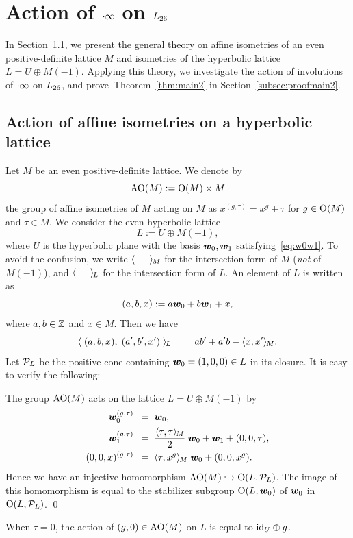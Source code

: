 \documentclass{amsart} %
\begin{document}
\section{Action of $\cdot \infty$ on $L_{26}$}\label{sec:proofThm2}
%
In  Section~\ref{subsec:AOGM}, 
we present the general theory on  affine isometries of an even positive-definite lattice $M$
and isometries of the hyperbolic  lattice $L=U\oplus M(-1)$.
Applying this theory,
we investigate the action of involutions of $\cdot \infty$ on $L_{26}$,
and prove~Theorem~\ref{thm:main2} in Section~\ref{subsec:proofmain2}.
%
%
\subsection{Action of affine isometries on a hyperbolic lattice}\label{subsec:AOGM}
%
Let $M$ be an even positive-definite lattice.
We denote by 
\[
\mathord{\mathrm{AO}}(M):=\mathord{\mathrm{O}}(M)\ltimes M
\]
 the group of affine isometries of $M$
acting on $M$ as $x^{(g, \tau)}=x^g+\tau$
for $g\in \mathord{\mathrm{O}}(M)$ and $\tau\in M$.
We consider the even hyperbolic lattice
\[
L:=U\oplus M(-1),
\]
where $U$ is  the hyperbolic plane with the basis $\boldsymbol{w}_0, \boldsymbol{w}_1$
satisfying~\eqref{eq:w0w1}.
To avoid the confusion, we write $\langle \phantom{a,a} \rangle_{\hskip -1pt M}$
for the intersection form of $M$ (\emph{not} of $M(-1)$),
and $\langle \phantom{a,a} \rangle_{\hskip -1pt L}$
for the intersection form of $L$.
An element of $L$ is written as 
\[
(a, b, x):=a\boldsymbol{w}_0+b \boldsymbol{w}_1+ x,
\]
where $a, b\in \mathord{\mathbb{Z}}$ and $x\in M$.
Then we have
\[
\langle \; (a, b, x), \; (a^{\prime}, b^{\prime}, x^{\prime})\; \rangle_{\hskip -1pt L}\;\;=\;\; ab^{\prime}+a^{\prime} b-\langle x, x^{\prime} \rangle_{\hskip -1pt M}.
\]
Let $\mathord{\mathcal{P}}_L$ be the positive cone containing 
$\boldsymbol{w}_0=(1,0, 0)\in L$ in its closure.
It is easy to verify the following:
%
\begin{proposition}\label{prop:embeddingAOG}
The group $\mathord{\mathrm{AO}}(M)$ acts on the lattice  $L=U\oplus M(-1)$
by
%
\begin{align*}
\boldsymbol{w}_0^{(g, \tau)}  \;\;=\;\; & \boldsymbol{w}_0, \\
\boldsymbol{w}_1^{(g, \tau)} \;\;=\;\; & \frac{\langle \tau, \tau \rangle_{\hskip -1pt M}}{2}\;\boldsymbol{w}_0+\boldsymbol{w}_1+(0,0,\tau),  \\
(0,0,x)^{(g, \tau)}  \;\;=\;\;  &\langle \tau, x^g \rangle_{\hskip -1pt M} \;\boldsymbol{w}_0 + (0,0, x^g).
\end{align*}
Hence we have an injective homomorphism $\mathord{\mathrm{AO}}(M)\hookrightarrow \mathord{\mathrm{O}}(L, \mathord{\mathcal{P}}_L)$.
The image of this homomorphism is equal to
the stabilizer subgroup $\mathord{\mathrm{O}}(L, \boldsymbol{w}_0)$ of $\boldsymbol{w}_0$ in $\mathord{\mathrm{O}}(L, \mathord{\mathcal{P}}_L)$.
\qed
%
\end{proposition}
%
\begin{remark}\label{rem:tau0}
When  $\tau=0$, the action of $(g, 0)\in \mathord{\mathrm{AO}}(M)$ on $L$ 
is equal to $\mathord{\mathrm{id}}_U\oplus g$.
\end{remark}
\end{document}
